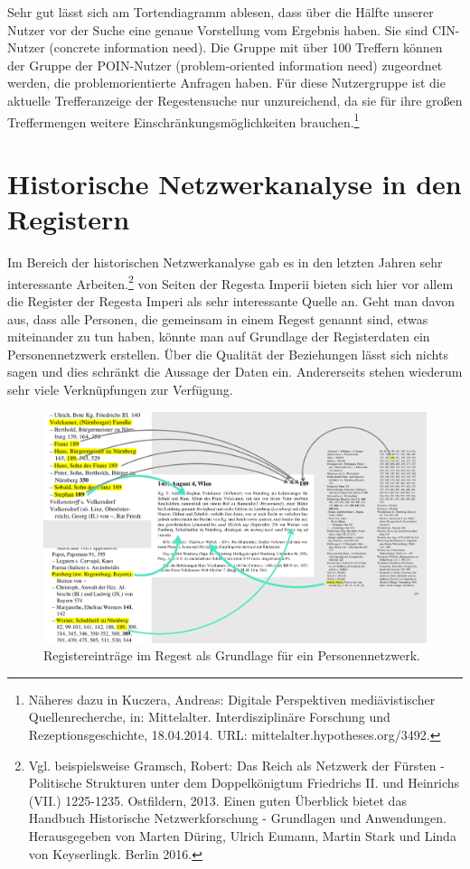 \documentclass[ngerman,]{scrreprt}
\begin{document}
Sehr gut lässt sich am Tortendiagramm ablesen, dass über die Hälfte unserer Nutzer vor der Suche eine genaue Vorstellung vom Ergebnis haben. Sie sind CIN-Nutzer (concrete information need). Die Gruppe mit über 100 Treffern können der Gruppe der POIN-Nutzer (problem-oriented information need) zugeordnet werden, die problemorientierte Anfragen haben. Für diese Nutzergruppe ist die aktuelle Trefferanzeige der Regestensuche nur unzureichend, da sie für ihre großen Treffermengen weitere Einschränkungsmöglichkeiten brauchen.\footnote{Näheres dazu in Kuczera, Andreas: Digitale Perspektiven mediävistischer Quellenrecherche, in: Mittelalter. Interdisziplinäre Forschung und Rezeptionsgeschichte, 18.04.2014. URL: mittelalter.hypotheses.org/3492.}

\section{Historische Netzwerkanalyse in den Registern}\label{historische-netzwerkanalyse-in-den-registern}

Im Bereich der historischen Netzwerkanalyse gab es in den letzten Jahren sehr interessante Arbeiten.\footnote{Vgl. beispielsweise Gramsch, Robert: Das Reich als Netzwerk der Fürsten - Politische Strukturen unter dem Doppelkönigtum Friedrichs II. und Heinrichs (VII.) 1225-1235. Ostfildern, 2013. Einen guten Überblick bietet das Handbuch Historische Netzwerkforschung - Grundlagen und Anwendungen. Herausgegeben von Marten Düring, Ulrich Eumann, Martin Stark und Linda von Keyserlingk. Berlin 2016.} von Seiten der Regesta Imperii bieten sich hier vor allem die Register der Regesta Imperi als sehr interessante Quelle an. Geht man davon aus, dass alle Personen, die gemeinsam in einem Regest genannt sind, etwas miteinander zu tun haben, könnte man auf Grundlage der Registerdaten ein Personennetzwerk erstellen. Über die Qualität der Beziehungen lässt sich nichts sagen und dies schränkt die Aussage der Daten ein. Andererseits stehen wiederum sehr viele Verknüpfungen zur Verfügung.

\begin{figure}
\centering
\includegraphics{Bilder/Register-und-Regest-19-189.png}
\caption{Registereinträge im Regest als Grundlage für ein Personennetzwerk.}
\end{figure}
\end{document}
